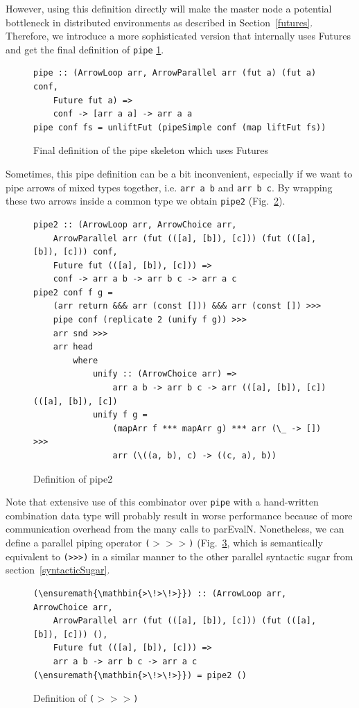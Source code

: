 \documentclass{jfp1}
\newcommand{\inlinecode}[1]{\texttt{#1}}
\begin{document}
However, using this definition directly will make the master node a potential bottleneck in distributed environments as described in Section~\ref{futures}. Therefore, we introduce a more sophisticated version that internally uses Futures and get the final definition of \inlinecode{pipe} \ref{fig:pipe}.
\begin{figure}[h]
\begin{lstlisting}[frame=htrbl]
pipe :: (ArrowLoop arr, ArrowParallel arr (fut a) (fut a) conf,
	Future fut a) =>
	conf -> [arr a a] -> arr a a
pipe conf fs = unliftFut (pipeSimple conf (map liftFut fs))
\end{lstlisting}
\caption{Final definition of the pipe skeleton which uses Futures}
\label{fig:pipe}
\end{figure}

Sometimes, this pipe definition can be a bit inconvenient, especially if we want to pipe arrows of mixed types together, i.e. \inlinecode{arr a b} and \inlinecode{arr b c}. By wrapping these two arrows inside a common type we obtain \inlinecode{pipe2} (Fig.~\ref{fig:pipe2}).
\begin{figure}[h]
\begin{lstlisting}[frame=htrbl]
pipe2 :: (ArrowLoop arr, ArrowChoice arr,
	ArrowParallel arr (fut (([a], [b]), [c])) (fut (([a], [b]), [c])) conf,
	Future fut (([a], [b]), [c])) =>
	conf -> arr a b -> arr b c -> arr a c
pipe2 conf f g =
	(arr return &&& arr (const [])) &&& arr (const []) >>>
	pipe conf (replicate 2 (unify f g)) >>>
	arr snd >>>
	arr head
		where
			unify :: (ArrowChoice arr) =>
				arr a b -> arr b c -> arr (([a], [b]), [c]) (([a], [b]), [c])
			unify f g =
				(mapArr f *** mapArr g) *** arr (\_ -> []) >>>
				arr (\((a, b), c) -> ((c, a), b))
\end{lstlisting}
\caption{Definition of pipe2}
\label{fig:pipe2}
\end{figure}

Note that extensive use of this combinator over \inlinecode{pipe} with a hand-written combination data type will probably result in worse performance because of more communication overhead from the many calls to parEvalN. Nonetheless, we can define a parallel piping operator \inlinecode{(\ensuremath{\mathbin{>\!>\!>}})} (Fig.~\ref{fig:par>>>}, which is semantically equivalent to \inlinecode{(>>>)} in a similar manner to the other parallel syntactic sugar from section~\ref{syntacticSugar}.
\begin{figure}[h]
\begin{lstlisting}[frame=htrbl]
(\ensuremath{\mathbin{>\!>\!>}}) :: (ArrowLoop arr, ArrowChoice arr,
	ArrowParallel arr (fut (([a], [b]), [c])) (fut (([a], [b]), [c])) (),
	Future fut (([a], [b]), [c])) =>
	arr a b -> arr b c -> arr a c
(\ensuremath{\mathbin{>\!>\!>}}) = pipe2 ()
\end{lstlisting}
\caption{Definition of \texttt{(\ensuremath{\mathbin{>\!>\!>}})}}
\label{fig:par>>>}
\end{figure}
\end{document}
